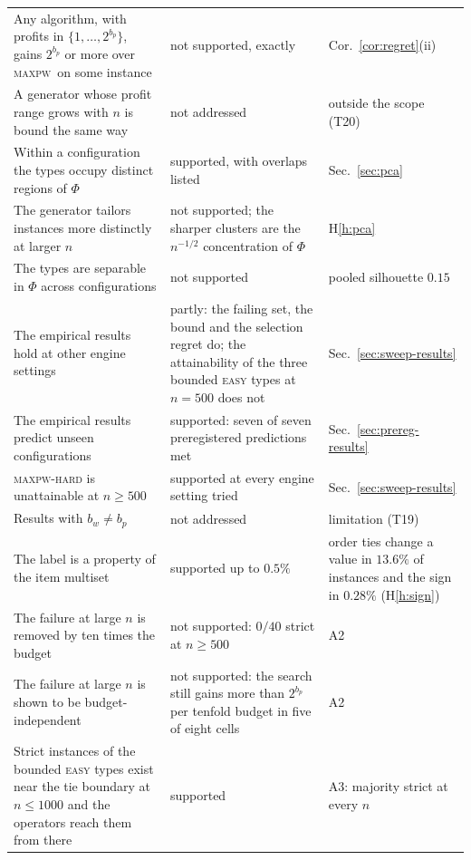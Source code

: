 \documentclass[a4paper,11pt]{article}
\newcommand{\bw}{b_{w}}
\newcommand{\bp}{b_{p}}
\newcommand{\MAXPW}{\textsc{maxpw}}
\theoremstyle{plain}
\theoremstyle{definition}
\theoremstyle{remark}
\begin{document}
\begin{center}
\begin{tabular}{@{}p{6.4cm}p{2.2cm}p{6.6cm}@{}}
Any algorithm, with profits in $\{1,\dots,2^{\bp}\}$, gains $2^{\bp}$ or more over \MAXPW\ on some instance & not supported, exactly & Cor.~\ref{cor:regret}(ii) \\
A generator whose profit range grows with $n$ is bound the same way & not addressed & outside the scope (T20) \\
Within a configuration the types occupy distinct regions of $\Phi$ & supported, with overlaps listed & Sec.~\ref{sec:pca} \\
The generator tailors instances more distinctly at larger $n$ & not supported; the sharper clusters are the $n^{-1/2}$ concentration of $\Phi$ & H\ref{h:pca} \\
The types are separable in $\Phi$ across configurations & not supported & pooled silhouette $0.15$ \\
The empirical results hold at other engine settings & partly: the failing set, the bound and the selection regret do; the attainability of the three bounded \textsc{easy} types at $n=500$ does not & Sec.~\ref{sec:sweep-results} \\
The empirical results predict unseen configurations & supported: seven of seven preregistered predictions met & Sec.~\ref{sec:prereg-results} \\
\MAXPW-\textsc{hard} is unattainable at $n\ge500$ & supported at every engine setting tried & Sec.~\ref{sec:sweep-results} \\
Results with $\bw\ne\bp$ & not addressed & limitation (T19) \\
The label is a property of the item multiset & supported up to $0.5\%$ & order ties change a value in $13.6\%$ of instances and the sign in $0.28\%$ (H\ref{h:sign}) \\
The failure at large $n$ is removed by ten times the budget & not supported: $0/40$ strict at $n\ge500$ & A2 \\
The failure at large $n$ is shown to be budget-independent & not supported: the search still gains more than $2^{\bp}$ per tenfold budget in five of eight cells & A2 \\
Strict instances of the bounded \textsc{easy} types exist near the tie boundary at $n\le1000$ and the operators reach them from there & supported & A3: majority strict at every $n$ \\
\bottomrule
\end{tabular}
\end{center}

\end{document}
